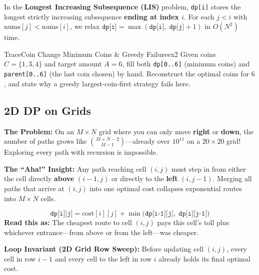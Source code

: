 \documentclass[11pt,a4paper]{article}
\theoremstyle{definition}
\newcommand{\painbeat}{\textbf{\color{accentamber}The Problem:} }
\newcommand{\ahabeat}{\textbf{\color{accentteal}The ``Aha!'' Insight:} }
\newcommand{\invariantbeat}[1]{\par\noindent\textbf{\color{accentteal}Loop Invariant (#1):} }
\begin{document}
In the \textbf{Longest Increasing Subsequence (LIS)} problem, \texttt{dp[i]} stores the longest strictly increasing subsequence \textbf{ending at index $i$}. For each $j < i$ with $\text{nums}[j] < \text{nums}[i]$, we relax $\texttt{dp[i]} = \max(\texttt{dp[i]},\; \texttt{dp[j]} + 1)$ in $O(N^2)$ time.

\begin{tryitbox}{Trace}{Coin Change Minimum Coins \& Greedy Failure}{ex2}
Given coins $C = \{1, 3, 4\}$ and target amount $A = 6$, fill both \texttt{dp[0..6]} (minimum coins) and \texttt{parent[0..6]} (the last coin chosen) by hand. Reconstruct the optimal coins for $6$, and state why a greedy largest-coin-first strategy fails here.
\end{tryitbox}

\subsection{2D DP on Grids}

\painbeat On an $M \times N$ grid where you can only move \textbf{right} or \textbf{down}, the number of paths grows like $\binom{M+N-2}{M-1}$---already over $10^{11}$ on a $20 \times 20$ grid! Exploring every path with recursion is impossible.

\ahabeat Any path reaching cell $(i, j)$ must step in from either the cell directly \textbf{above} $(i-1, j)$ or directly to the \textbf{left} $(i, j-1)$. Merging all paths that arrive at $(i, j)$ into one optimal cost collapses exponential routes into $M \times N$ cells.

\begin{formulabox}
$$\texttt{dp[i][j]} = \text{cost}[i][j] + \min\big(\texttt{dp[i-1][j]},\; \texttt{dp[i][j-1]}\big)$$
\textbf{Read this as:} The cheapest route to cell $(i, j)$ pays this cell's toll plus whichever entrance---from above or from the left---was cheaper.
\end{formulabox}

\invariantbeat{2D Grid Row Sweep} Before updating cell $(i, j)$, every cell in row $i-1$ and every cell to the left in row $i$ already holds its final optimal cost.
\end{document}
